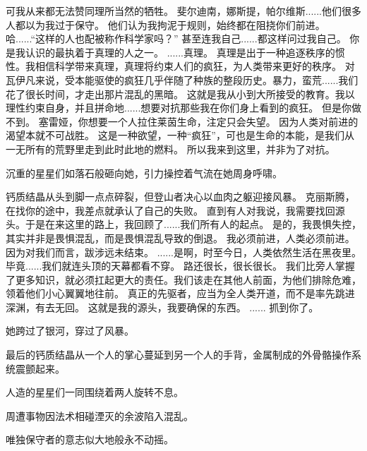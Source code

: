 \documentclass[openany]{book}
\begin{document}
\begin{dialogue}
     可我从来都无法赞同理所当然的牺牲。
     斐尔迪南，娜斯提，帕尔维斯......他们很多人都以为我过于保守。
     他们认为我拘泥于规则，始终都在阻挠你们前进。
     哈......“这样的人也配被称作科学家吗？”
     甚至连我自己......都这样问过我自己。
     你是我认识的最执着于真理的人之一。
     ......真理。
     真理是出于一种追逐秩序的惯性。我相信科学带来真理，真理将约束人们的疯狂，为人类带来更好的秩序。
     对瓦伊凡来说，受本能驱使的疯狂几乎伴随了种族的整段历史。暴力，蛮荒......我们花了很长时间，才走出那片混乱的黑暗。
     这就是我从小到大所接受的教育。我以理性约束自身，并且拼命地......想要对抗那些我在你们身上看到的疯狂。
     但是你做不到。
     塞雷娅，你想要一个人拉住莱茵生命，注定只会失望。
     因为人类对前进的渴望本就不可战胜。
     这是一种欲望，一种“疯狂”，可也是生命的本能，是我们从一无所有的荒野里走到此时此地的燃料。
     所以我来到这里，并非为了对抗。\par
    沉重的星星们如落石般砸向她，引力操控着气流在她周身呼啸。\par
    钙质结晶从头到脚一点点碎裂，但登山者决心以血肉之躯迎接风暴。
     克丽斯腾，在找你的途中，我差点就承认了自己的失败。
     直到有人对我说，我需要找回源头。于是在来这里的路上，我回顾了......我们所有人的起点。
     是的，我畏惧失控，其实并非是畏惧混乱，而是畏惧混乱导致的倒退。
     我必须前进，人类必须前进。因为对我们而言，跋涉远未结束。
     ......是啊，时至今日，人类依然生活在黑夜里。
     毕竟......我们就连头顶的天幕都看不穿。
     路还很长，很长很长。
     我们比旁人掌握了更多知识，就必须扛起更大的责任。我们该走在其他人前面，为他们排除危难，领着他们小心翼翼地往前。
     真正的先驱者，应当为全人类开道，而不是率先跳进深渊，有去无回。
     这就是我的源头，我要确保的东西。
     ......
     抓到你了。\par
    她跨过了银河，穿过了风暴。\par
    最后的钙质结晶从一个人的掌心蔓延到另一个人的手背，金属制成的外骨骼操作系统震颤起来。\par
    人造的星星们一同围绕着两人旋转不息。\par
    周遭事物因法术相碰湮灭的余波陷入混乱。\par
    唯独保守者的意志似大地般永不动摇。
\end{dialogue}
\end{document}
